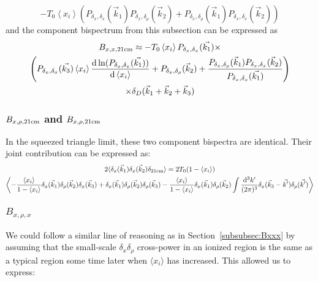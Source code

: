 \begin{equation}
-T_0 \left\langle x_i \right\rangle \left(P_{\delta_x, \delta_x}(\vec{k}_1) P_{\delta_x, \delta_{\rho}}(\vec{k}_2)  + P_{\delta_x, \delta_{\rho}}(\vec{k}_1) P_{\delta_x, \delta_x}(\vec{k}_2)  \right)
\end{equation}
and the component bispectrum from this subsection can be expressed as
\begin{multline}
B_{x,x,{\rm 21cm}} \approx 
 - T_0 \left\langle x_i \right\rangle P_{\delta_x,\delta_x}(\vec{k_1}) \times \\
\left(
P_{\delta_x,\delta_x}(\vec{k_3}) \left\langle x_i \right\rangle \frac{{\rm d} \ln (P_{\delta_x,\delta_x}(\vec{k_1}))}{{\rm d}\left\langle x_i \right\rangle} 
+ P_{\delta_x, \delta_{\rho}}(\vec{k}_2)  +\frac{ P_{\delta_x, \delta_{\rho}}(\vec{k}_1)P_{\delta_x, \delta_x}(\vec{k}_2)}{P_{\delta_x,\delta_x}(\vec{k_1}) } 
\right) \\
\times \delta_D(\vec{k}_1+\vec{k}_2+\vec{k}_3)
\end{multline}

\subsubsection{$B_{x,\rho,{\rm 21cm}}$ and $B_{x,\rho,{\rm 21cm}}$}
\label{subsec:B_xrho21}

In the squeezed triangle limit, these two component bispectra are identical. Their joint contribution can be expressed as:
\begin{multline}
2\langle \delta_x(\vec{k}_1) \delta_x(\vec{k}_2) \delta_{{\rm 21cm}}\rangle = 
2T_0(1-\left\langle x_i \right\rangle) \\ \left\langle 
- \frac{\left\langle x_i \right\rangle}{1-\left\langle x_i \right\rangle} \delta_x(\vec{k}_1) \delta_{\rho}(\vec{k}_2) \delta_x(\vec{k}_3)
+ \delta_x(\vec{k}_1) \delta_{\rho}(\vec{k}_2) \delta_{\rho}(\vec{k}_3)
- \frac{\left\langle x_i \right\rangle}{1-\left\langle x_i \right\rangle} \delta_x(\vec{k}_1) \delta_{\rho}(\vec{k}_2) \int \frac{{\rm d^3}k'}{(2\pi)^3} \delta_x(\vec{k}_3 - \vec{k'})\delta_{\rho}(\vec{k'})\right\rangle
\end{multline}

\subsubsection*{$B_{x,\rho,x}$}
\label{subsubsec:Bxrhox}
We could follow a similar line of reasoning as in Section~\ref{subsubsec:Bxxx} by assuming that the small-scale $\delta_x\delta_{\rho}$ cross-power in an ionized region is the same as a typical region some time later when $\langle x_i \rangle$ has increased. This allowed us to express:

